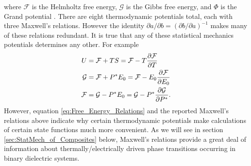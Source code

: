 \documentclass[english,12pt]{ttuthes}
\newcommand{\Fc}{\mathcal{F}}
\begin{document}
where $\Fc$ is the Helmholtz free energy, $\mathcal{G}$ is the
Gibbs free energy, and $\Phi$ is the Grand potential
\cite{Robertson-1993}. There are eight thermodynamic potentials total,
each with three Maxwell's relations. However the identity
\cite{Robertson-1993} $\partial a/\partial b=(\partial b/\partial a)^{-1}$ makes many of these
relations redundant. It is true that any of these statistical
mechanics potentials determines any other. For example
\cite{Baker-1990}    
%
\begin{align}  \label{eq:Free_Energy_Relations}
  U&=\Fc+TS=\Fc-T\frac{\partial \Fc}{\partial T}\\
  \mathcal{G}&=\Fc+P^*E_0=\Fc-E_0\frac{\partial \Fc}{\partial E_0}\notag\\
  \Fc&=\mathcal{G}-P^*E_0=\mathcal{G}-P^*\frac{\partial \mathcal{G}}{\partial P^*}.\notag
\end{align}
%
However, equation \eqref{eq:Free_Energy_Relations} and the reported
Maxwell's relations above indicate why certain thermodynamic
potentials make calculations of certain state functions much more
convenient.  As we will see in section
\ref{sec:StatMech_of_Composites} below, Maxwell's relations provide a
great deal of information about thermally/electrically driven phase   
transitions occurring in binary dielectric systems. 
%
\end{document}
